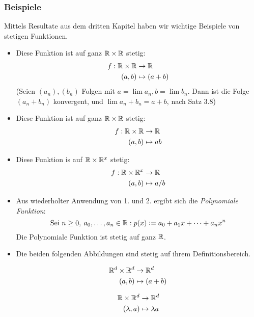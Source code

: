 \subsubsection*{Beispiele}
Mittels Resultate aus dem dritten Kapitel haben wir wichtige Beispiele von stetigen Funktionen.
\begin{itemize}
\item Diese Funktion ist auf ganz $\mathbb{R}\times\mathbb{R}$ stetig: \begin{align*}f:\mathbb{R}\times\mathbb{R}&\to\mathbb{R} \\ (a,b) &\mapsto (a+b) \end{align*} (Seien $(a_{n}), (b_{n})$ Folgen mit $a = \lim{a_{n}}, b = \lim{b_{n}}$. Dann ist die Folge $(a_{n} + b_{n})$ konvergent, und $\lim{a_{n}+b_{n}} = a + b$, nach Satz 3.8) 
\item Diese Funktion ist auf ganz $\mathbb{R}\times\mathbb{R}$ stetig:
\begin{align*}f:\mathbb{R}\times\mathbb{R}&\to\mathbb{R} \\ (a,b)&\mapsto ab \end{align*}
\item Diese Funktion is auf $\mathbb{R}\times\mathbb{R}^{x}$ stetig:
\begin{align*}f:\mathbb{R}\times\mathbb{R}^{x}&\to\mathbb{R} \\ (a,b)&\mapsto a/b \end{align*}
\item Aus wiederholter Anwendung von 1. und 2. ergibt sich die \emph{Polynomiale Funktion}:
\[\text{Sei } n \geq 0,\: a_{0}, \dots, a_{n}\in\mathbb{R}: p(x)\vcentcolon= a_{0} + a_{1}x + \dots + a_{n}x^{n} \]
Die Polynomiale Funktion ist stetig auf ganz $\mathbb{R}$.
\item Die beiden folgenden Abbildungen sind stetig auf ihrem Definitionsbereich. 
\begin{figure}[htbp]
\begin{minipage}[t][4mm][b]{0.5\textwidth}
\begin{align*} \mathbb{R}^{d}\times\mathbb{R}^{d}&\to\mathbb{R}^{d} \\ (a,b)&\mapsto(a+b)\end{align*} 
\end{minipage}
\begin{minipage}[t][4mm][b]{0.5\textwidth}
\begin{align*}  \mathbb{R}\times\mathbb{R}^{d}&\to\mathbb{R}^{d} \\ (\lambda,a)&\mapsto\lambda a \end{align*}
\end{minipage}
\end{figure}


\end{itemize}
